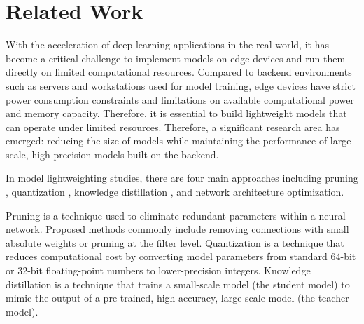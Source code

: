 \documentclass[conference]{IEEEtran}
\begin{document}
\section{Related Work}
With the acceleration of deep learning applications in the real world, it has become a critical challenge to implement models on edge devices and run them directly on limited computational resources. Compared to backend environments such as servers and workstations used for model training, edge devices have strict power consumption constraints and limitations on available computational power and memory capacity. Therefore, it is essential to build lightweight models that can operate under limited resources. Therefore, a significant research area has emerged: reducing the size of models while maintaining the performance of large-scale, high-precision models built on the backend.

In model lightweighting studies, there are four main approaches including pruning \cite{10643325}, quantization \cite{10.1145/3451211}, knowledge distillation \cite{hinton2015distillingknowledgeneuralnetwork}, and network architecture optimization.

Pruning is a technique used to eliminate redundant parameters within a neural network. Proposed methods commonly include removing connections with small absolute weights or pruning at the filter level. Quantization is a technique that reduces computational cost by converting model parameters from standard 64-bit or 32-bit floating-point numbers to lower-precision integers. Knowledge distillation is a technique that trains a small-scale model (the student model) to mimic the output of a pre-trained, high-accuracy, large-scale model (the teacher model).
\end{document}
